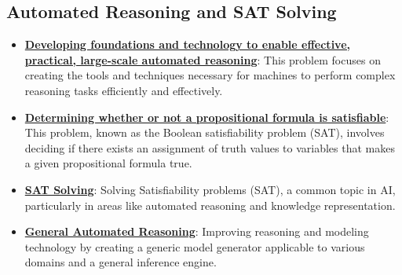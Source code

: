 \documentclass{article}%
\begin{document}
%
\subsection{Automated Reasoning and SAT Solving}%
\label{subsec:AutomatedReasoningandSATSolving}%
\begin{itemize}[leftmargin=*]%
\item \href{https://purdue.brightspace.com/d2l/common/assets/pdfjs-d2l-dist/1.0.14-legacy/web/viewer.html?file=\%2Fcontent\%2Fenforced\%2F1095467-wl.202510.CS.24300.001\%2F13L1-Logic.pdf\%3Fou\%3D1095467\&lang=en-us\&container=d2l-fileviewer-rendered-pdf\&fullscreen=d2l-fileviewer-rendered-pdf-dialog\&height=667#page=4}{\textbf{Developing foundations and technology to enable effective, practical, large-scale automated reasoning}}: This problem focuses on creating the tools and techniques necessary for machines to perform complex reasoning tasks efficiently and effectively.%
\item \href{https://purdue.brightspace.com/d2l/common/assets/pdfjs-d2l-dist/1.0.14-legacy/web/viewer.html?file=\%2Fcontent\%2Fenforced\%2F1095467-wl.202510.CS.24300.001\%2F13L1-Logic.pdf\%3Fou\%3D1095467\&lang=en-us\&container=d2l-fileviewer-rendered-pdf\&fullscreen=d2l-fileviewer-rendered-pdf-dialog\&height=667#page=15}{\textbf{Determining whether or not a propositional formula is satisfiable}}: This problem, known as the Boolean satisfiability problem (SAT), involves deciding if there exists an assignment of truth values to variables that makes a given propositional formula true.%
\item \href{https://purdue.brightspace.com/d2l/common/assets/pdfjs-d2l-dist/1.0.14-legacy/web/viewer.html?file=\%2Fcontent\%2Fenforced\%2F1095467-wl.202510.CS.24300.001\%2F15L2-SAT.pdf\%3Fou\%3D1095467\&lang=en-us\&container=d2l-fileviewer-rendered-pdf\&fullscreen=d2l-fileviewer-rendered-pdf-dialog\&height=667#page=2}{\textbf{SAT Solving}}: Solving Satisfiability problems (SAT), a common topic in AI, particularly in areas like automated reasoning and knowledge representation.%
\item \href{https://purdue.brightspace.com/d2l/common/assets/pdfjs-d2l-dist/1.0.14-legacy/web/viewer.html?file=\%2Fcontent\%2Fenforced\%2F1095467-wl.202510.CS.24300.001\%2F15L2-SAT.pdf\%3Fou\%3D1095467\&lang=en-us\&container=d2l-fileviewer-rendered-pdf\&fullscreen=d2l-fileviewer-rendered-pdf-dialog\&height=667#page=3}{\textbf{General Automated Reasoning}}: Improving reasoning and modeling technology by creating a generic model generator applicable to various domains and a general inference engine.%

\end{itemize}
\end{document}
